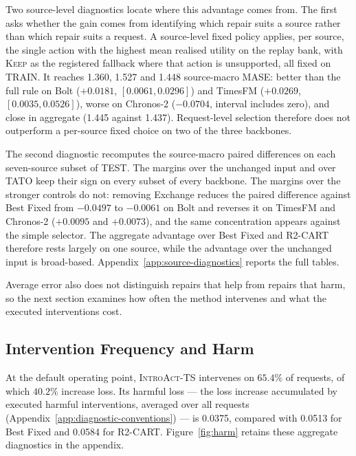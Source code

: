 \documentclass{article}
\newcommand{\introact}{\textsc{IntroAct-TS}}
\begin{document}
Two source-level diagnostics locate where this advantage comes from. The first asks whether
the gain comes from identifying which repair suits a source rather than which repair suits a
request. A source-level fixed policy applies, per source, the single action with the highest
mean realised utility on the replay bank, with \textsc{Keep} as the registered fallback where
that action is unsupported, all fixed on TRAIN. It reaches 1.360, 1.527 and 1.448 source-macro
MASE: better than the full rule on Bolt ($+0.0181$, $[0.0061,0.0296]$) and TimesFM
($+0.0269$, $[0.0035,0.0526]$), worse on Chronos-2 ($-0.0704$, interval includes zero), and
close in aggregate (1.445 against 1.437). Request-level selection therefore does not
outperform a per-source fixed choice on two of the three backbones.

The second diagnostic recomputes the source-macro paired differences on each seven-source
subset of TEST. The margins over the unchanged input and over TATO keep their sign on every
subset of every backbone. The margins over the stronger controls do not: removing Exchange
reduces the paired difference against Best Fixed from $-0.0497$ to $-0.0061$ on Bolt and
reverses it on TimesFM and Chronos-2 ($+0.0095$ and $+0.0073$), and the same concentration
appears against the simple selector. The aggregate advantage over Best Fixed and R2-CART
therefore rests largely on one source, while the advantage over the unchanged input is
broad-based. Appendix~\ref{app:source-diagnostics} reports the full tables.

Average error also does not distinguish repairs that help from repairs that harm, so the next
section examines how often the method intervenes and what the executed interventions cost.

\subsection{Intervention Frequency and Harm}
\label{sec:exp-harm}
At the default operating point, \introact{} intervenes on $65.4\%$ of requests, of which
$40.2\%$ increase loss. Its harmful loss — the loss increase accumulated by executed harmful
interventions, averaged over all requests (Appendix~\ref{app:diagnostic-conventions}) — is
0.0375, compared with 0.0513 for Best Fixed and
0.0584 for R2-CART. Figure~\ref{fig:harm} retains these aggregate diagnostics in the appendix.
\end{document}
